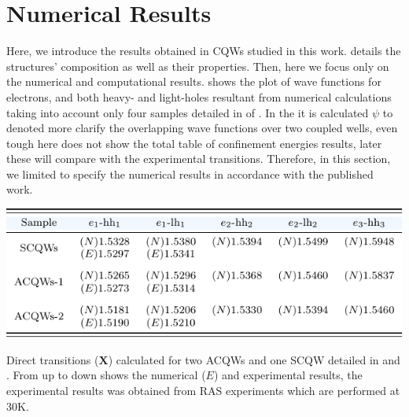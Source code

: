 \section{Numerical Results}
\label{sec:chapter-2-numerical-results}
\vspace{-10mm} 
Here, we introduce the results obtained in \gls{CQWs} studied in this work.  
details the structures' composition as well as their properties. Then, here we focus only on the numerical and computational results.  shows the plot of wave functions for electrons, and both heavy- and light-holes resultant from numerical calculations taking into account only four samples detailed in  of .
In the  it is calculated $\psi$ to denoted more clarify the overlapping wave functions over two coupled wells, even tough here does not show the total table of confinement energies results, later these will  compare with the experimental transitions.  Therefore, in this section, we limited to specify the numerical results  in accordance with the published work\cite{ruiz2021optical}. 
\begin{table}[hb!]
	\centering
	\includegraphics[width=\textwidth]{../tables/chapter-2/numerical-results/build-ruco/numerical-results.pdf}
	\caption{Direct transitions ($\mathbf{X}$) calculated for two ACQWs and one SCQW detailed in  and . From up to down shows the numerical ($E$) and experimental results, the experimental results was obtained from RAS experiments which are performed at 30K. }
	\label{tab:sec-chapter-2-numerical-results} 
\end{table}
